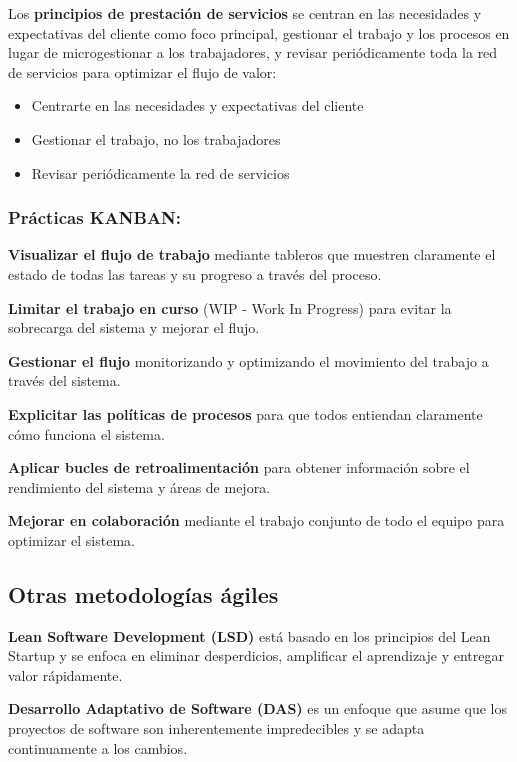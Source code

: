     Los \textbf{principios de prestación de servicios} se centran en las necesidades y expectativas del cliente como foco principal, gestionar el trabajo y los procesos en lugar de microgestionar a los trabajadores, y revisar periódicamente toda la red de servicios para optimizar el flujo de valor:
    \begin{itemize}
        \item Centrarte en las necesidades y expectativas del cliente
        \item  Gestionar el trabajo, no los trabajadores
        \item Revisar periódicamente la red de servicios
    \end{itemize}

    \subsubsection{Prácticas KANBAN:}

    \textbf{Visualizar el flujo de trabajo} mediante tableros que muestren claramente el estado de todas las tareas y su progreso a través del proceso.

    \textbf{Limitar el trabajo en curso} (WIP - Work In Progress) para evitar la sobrecarga del sistema y mejorar el flujo.

    \textbf{Gestionar el flujo} monitorizando y optimizando el movimiento del trabajo a través del sistema.

    \textbf{Explicitar las políticas de procesos} para que todos entiendan claramente cómo funciona el sistema.

    \textbf{Aplicar bucles de retroalimentación} para obtener información sobre el rendimiento del sistema y áreas de mejora.

    \textbf{Mejorar en colaboración} mediante el trabajo conjunto de todo el equipo para optimizar el sistema.


    \subsection{Otras metodologías ágiles}\label{subsec:otras-metodologias-agiles}

    \textbf{Lean Software Development (LSD)} está basado en los principios del Lean Startup y se enfoca en eliminar desperdicios, amplificar el aprendizaje y entregar valor rápidamente.

    \textbf{Desarrollo Adaptativo de Software (DAS)} es un enfoque que asume que los proyectos de software son inherentemente impredecibles y se adapta continuamente a los cambios.

